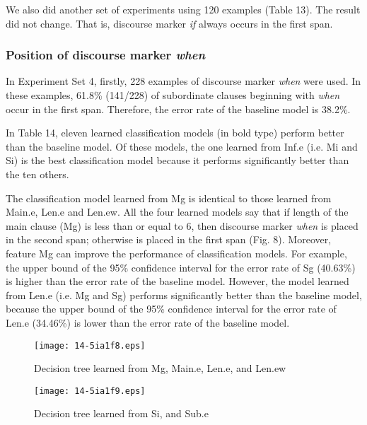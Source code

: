 \documentclass[english]{jnlp_1.3e}
\begin{document}
\begin{table}[t]

\end{table}

We also did another set of experiments using 120 examples 
(Table 13). The result did not change. That is,
discourse marker \textit{if} always occurs in the first
span. 


\subsubsection{Position of discourse marker \textit{when}}

In Experiment Set 4, firstly, 228 examples of discourse marker \textit{when} 
were used. In these examples, 61.8\% (141/228) of subordinate clauses
beginning with \textit{when} occur in the first span. Therefore, 
the error rate of the baseline model is 38.2\%.  

In Table 14, eleven learned classification models (in bold type) perform 
better than the baseline model. Of these models, 
the one learned from Inf.e (i.e. Mi and Si) is the best 
classification model because it performs significantly better 
than the ten others.

The classification model learned from Mg is identical to 
those learned from Main.e, Len.e and Len.ew. All the four 
learned models say that if length of the main clause (Mg) is less than or equal 
to 6, then discourse marker \textit{when} is placed in the second 
span; otherwise is placed in the first span (Fig. 8). Moreover, 
feature Mg can improve the performance of 
classification models. For example, the upper bound of the 95\% 
confidence interval for the error rate of Sg (40.63\%) is higher than the
error rate of the baseline model. However, the model 
learned from Len.e (i.e. Mg and Sg) performs significantly 
better than the baseline model, because the upper bound of 
the 95\% confidence interval for the error rate of Len.e (34.46\%)
is lower than the error rate of the baseline model.

\begin{table}[t]

\end{table}
\begin{figure}[t]
\begin{center}
\texttt{[image: 14-5ia1f8.eps]}
\end{center}
 \caption{Decision tree learned from Mg, Main.e, Len.e, and Len.ew}
\end{figure}
\begin{figure}[t]
\begin{center}
\texttt{[image: 14-5ia1f9.eps]}
\end{center}
 \caption{Decision tree learned from Si, and Sub.e}
\end{figure}
\end{document}
